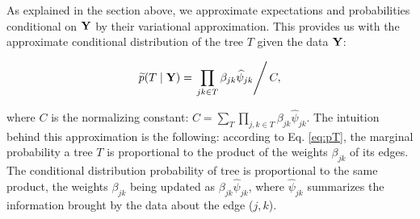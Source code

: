 As explained in the section above, we approximate expectations and probabilities conditional on ${\bf Y}$ by their variational approximation.
This provides us with the approximate conditional distribution of the tree $T$ given the data ${\bf Y}$:
\begin{linenomath*}
$$
\widetilde{p}(T  \mid  {\bf Y}) = \left. \prod_{jk \in T} \beta_{jk} \widehat{\psi}_{jk}  \right/ C,
$$
\end{linenomath*}
where $C$ is the normalizing constant: $C = \sum_T \prod_{j, k \in T} \beta_{jk} \widehat{\psi}_{jk}$. The intuition behind this approximation is the following: according to Eq. \eqref{eq:pT}, the marginal probability a tree $T$ is proportional to the product of the weights $\beta_{jk}$ of its edges. The conditional distribution probability of tree is proportional to the same product, the weights $\beta_{jk}$ being updated as $\beta_{jk} \widehat{\psi}_{jk}$, where $\widehat{\psi}_{jk}$ summarizes the information brought by the data about the edge ($j, k$).


